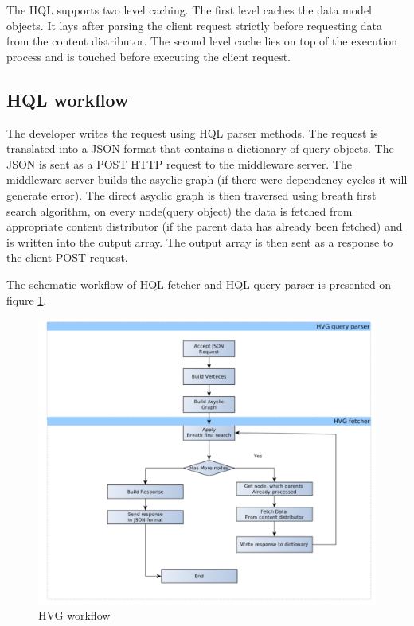 The HQL supports two level caching. The first level caches the data model objects. It lays after parsing the client request strictly before requesting data from the content distributor. The second level cache lies on top of the execution process and is touched before executing the client request. 


\subsection{HQL workflow}

The developer writes the request using HQL parser methods. The request is translated into a JSON format that contains a dictionary of query objects. The JSON is sent as a POST HTTP request to the middleware server. The middleware server builds the asyclic graph (if there were dependency cycles it will generate error). The direct asyclic graph is then traversed using breath first search algorithm, on every node(query object) the data is fetched from appropriate content distributor (if the parent data has already been fetched) and is written into the output array. The output array is then sent as a response to the client POST request. 

The schematic workflow of HQL fetcher and HQL query parser is presented on fiqure \ref{fig:hvg_workflow}.

\begin{figure}[h]
    \centering
	\includegraphics[width=\textwidth]{images/hvg_qp_workflow.png}
    \caption{HVG workflow}
    \label{fig:hvg_workflow}
\end{figure}

